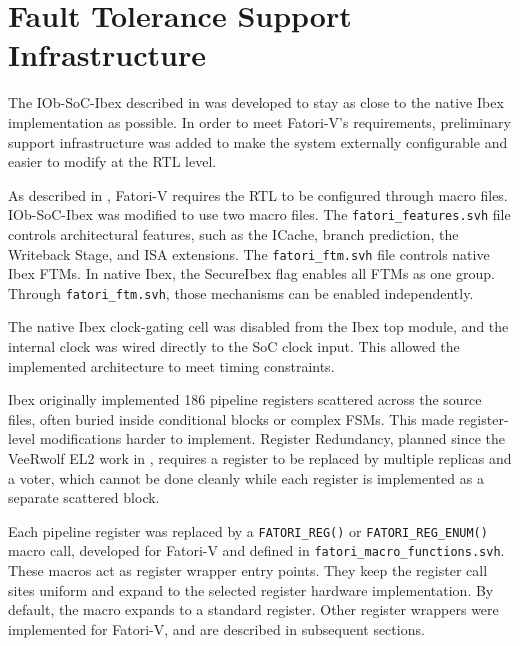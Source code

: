 \label{chap6:fatori_hardware}




\section{Fault Tolerance Support Infrastructure}
\label{chap6:starting}

The IOb-\ac{SoC}-Ibex described in  was developed to stay as close to the native Ibex implementation as possible. In order to meet \ac{Fatori-V}'s requirements, preliminary support infrastructure was added to make the system externally configurable and easier to modify at the \ac{RTL} level.

As described in , \ac{Fatori-V} requires the \ac{RTL} to be configured through macro files. IOb-\ac{SoC}-Ibex was modified to use two macro files. The \texttt{fatori\_features.svh} file controls architectural features, such as the ICache, branch prediction, the Writeback Stage, and \ac{ISA} extensions. The \texttt{fatori\_ftm.svh} file controls native Ibex \acp{FTM}. In native Ibex, the SecureIbex flag enables all \acp{FTM} as one group. Through \texttt{fatori\_ftm.svh}, those mechanisms can be enabled independently.

The native Ibex clock-gating cell was disabled from the Ibex top module, and the internal clock was wired directly to the \ac{SoC} clock input. This allowed the implemented architecture to meet timing constraints.

Ibex originally implemented 186 pipeline registers scattered across the source files, often buried inside conditional blocks or complex \acp{FSM}. This made register-level modifications harder to implement. Register Redundancy, planned since the VeeRwolf EL2 work in , requires a register to be replaced by multiple replicas and a voter, which cannot be done cleanly while each register is implemented as a separate scattered block.

Each pipeline register was replaced by a \texttt{FATORI\_REG()} or \texttt{FATORI\_REG\_ENUM()} macro call, developed for \ac{Fatori-V} and defined in \texttt{fatori\_macro\_functions.svh}. These macros act as register wrapper entry points. They keep the register call sites uniform and expand to the selected register hardware implementation. By default, the macro expands to a standard register. Other register wrappers were implemented for \ac{Fatori-V}, and are described in subsequent sections.

